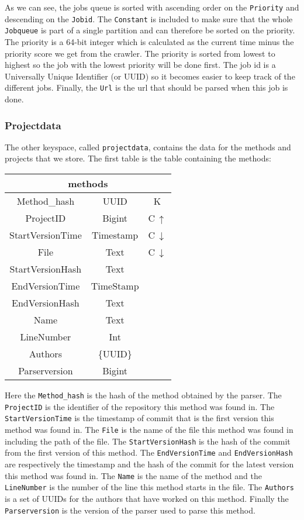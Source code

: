 \documentclass[../Main.tex]{subfiles}
\begin{document}
As we can see, the jobs queue is sorted with ascending order on the \texttt{Priority} and descending on the \texttt{Jobid}. The \texttt{Constant} is included to make sure that the whole \texttt{Jobqueue} is part of a single partition and can therefore be sorted on the priority. The priority is a 64-bit integer which is calculated as the current time minus the priority score we get from the crawler. The priority is sorted from lowest to highest so the job with the lowest priority will be done first. The job id is a Universally Unique Identifier (or UUID) so it becomes easier to keep track of the different jobs. Finally, the \texttt{Url} is the url that should be parsed when this job is done.

\subsubsection{Projectdata}
The other keyspace, called \texttt{projectdata}, contains the data for the methods and projects that we store. The first table is the table containing the methods:

\begin{table}[h]
    \centering
    \begin{tabular}{|ccc|}
\hline
    \multicolumn{3}{|c|}{\textbf{methods}}   \\
    \hline
    Method\_hash & UUID & K \\
    ProjectID & Bigint & C\,$\uparrow$\\
    StartVersionTime & Timestamp & C\,$\downarrow$\\
    File & Text & C\,$\downarrow$\\
    StartVersionHash & Text & \\
    EndVersionTime & TimeStamp & \\
    EndVersionHash & Text & \\
    Name & Text & \\
    LineNumber & Int & \\ 
    Authors & \{UUID\} & \\
    Parserversion & Bigint & \\
    \hline
\end{tabular}
\end{table}

Here the \texttt{Method\_hash} is the hash of the method obtained by the parser. The \texttt{ProjectID} is the identifier of the repository this method was found in. The \texttt{StartVersionTime} is the timestamp of commit that is the first version this method was found in. The \texttt{File} is the name of the file this method was found in including the path of the file. The \texttt{StartVersionHash} is the hash of the commit from the first version of this method. The \texttt{EndVersionTime} and \texttt{EndVersionHash} are respectively the timestamp and the hash of the commit for the latest version this method was found in. The \texttt{Name} is the name of the method and the \texttt{LineNumber} is the number of the line this method starts in the file. The \texttt{Authors} is a set of UUIDs for the authors that have worked on this method. Finally the \texttt{Parserversion} is the version of the parser used to parse this method.\\
\end{document}
